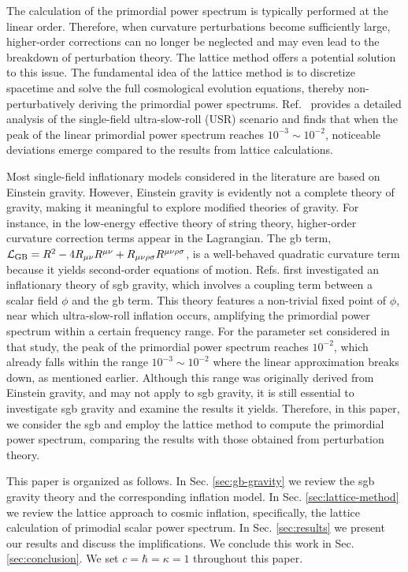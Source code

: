 \documentclass[reprint, 10pt, amsmath, amssymb, floatfix, aps, prd, superscriptaddress, nofootinbib, nobibnotes,twocolumn]{revtex4-1}
\begin{document}
The calculation of the primordial power spectrum is typically performed at the linear order. Therefore, when curvature perturbations become sufficiently large, higher-order corrections can no longer be neglected and may even lead to the breakdown of perturbation theory. The lattice method offers a potential solution to this issue. The fundamental idea of the lattice method is to discretize spacetime and solve the full cosmological evolution equations, thereby non-perturbatively deriving the primordial power spectrums. Ref.~\cite{Caravano:2024moy} provides a detailed analysis of the single-field ultra-slow-roll (USR) scenario and finds that when the peak of the linear primordial power spectrum reaches $10^{-3} \sim 10^{-2}$, noticeable deviations emerge compared to the results from lattice calculations.

Most single-field inflationary models considered in the literature are based on Einstein gravity. However, Einstein gravity is evidently not a complete theory of gravity, making it meaningful to explore modified theories of gravity. For instance, in the low-energy effective theory of string theory, higher-order curvature correction terms appear in the Lagrangian. The \ac{gb} term, ${\mathcal L}_{\rm GB} = R^2 - 4 R_{\mu\nu}R^{\mu\nu} + R_{\mu\nu\rho\sigma}R^{\mu\nu\rho\sigma}$, is a well-behaved quadratic curvature term because it yields second-order equations of motion. Refs.\cite{Kawai:2021bye,Kawai:2021edk} first investigated an inflationary theory of \ac{sgb} gravity, which involves a coupling term between a scalar field $\phi$ and the \ac{gb} term. This theory features a non-trivial fixed point of $\phi$, near which ultra-slow-roll inflation occurs, amplifying the primordial power spectrum within a certain frequency range. For the parameter set considered in that study, the peak of the primordial power spectrum reaches $10^{-2}$, which already falls within the range $10^{-3} \sim 10^{-2}$ where the linear approximation breaks down, as mentioned earlier. Although this range was originally derived from Einstein gravity, and may not apply to \ac{sgb} gravity, it is still essential to investigate \ac{sgb} gravity and examine the results it yields. Therefore, in this paper, we consider the \ac{sgb} and employ the lattice method to compute the primordial power spectrum, comparing the results with those obtained from perturbation theory.

This paper is organized as follows. In Sec. \ref{sec:gb-gravity} we review the \ac{sgb} gravity theory and the corresponding inflation model. In Sec. \ref{sec:lattice-method} we review the lattice approach to cosmic inflation, specifically, the lattice calculation of primodial scalar power spectrum. In Sec. \ref{sec:results} we present our results and discuss the implifications. We conclude this work in Sec. \ref{sec:conclusion}. We set $c = \hbar = \kappa = 1$ throughout this paper.
\end{document}
